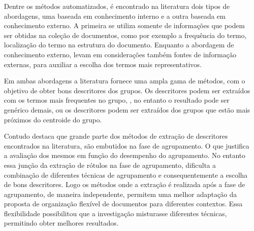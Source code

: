 Dentre os métodos automatizados, é encontrado na literatura dois tipos de abordagens, uma 
baseada em conhecimento interno e a outra baseada em conhecimento externo\cite{Nogueira2013}. 
A primeira se utiliza somente de informações que podem ser obtidas na coleção de documentos, 
como por exemplo a frequência do termo, localização do termo na estrutura do documento.
Enquanto a abordagem de conhecimento externo, levam em considerações também fontes de informação
externas, para auxiliar a escolha dos termos mais representativos. 

Em ambas abordagens a literatura fornece uma ampla gama de métodos, com o objetivo de obter bons
descritores dos grupos. Os descritores podem ser extraídos com os termos mais frequentes no grupo,
, no entanto o resultado pode ser genérico demais\cite{Pucktada2006}, ou os descritores podem
ser extraídos dos grupos que estão mais próximos do centroide do grupo.

Contudo \cite{Nogueira2013} destaca que grande parte dos métodos de extração de descritores 
encontrados na literatura, são embutidos na fase de agrupamento. O que justifica a avaliação 
dos mesmos em função do desempenho do agrupamento. No entanto essa junção da extração de rótulos
na fase de agrupamento, dificulta a combinação de diferentes técnicas de agrupamento e 
consequentemente a escolha de bons descritores. Logo os métodos onde a extração é realizada 
após a fase de agrupamento,
de maneira independente, permitem uma melhor adaptação da proposta de organização flexível de 
documentos para diferentes contextos. Essa flexibilidade possibilitou que a investigação
misturasse diferentes técnicas, permitindo obter melhores resultados.





